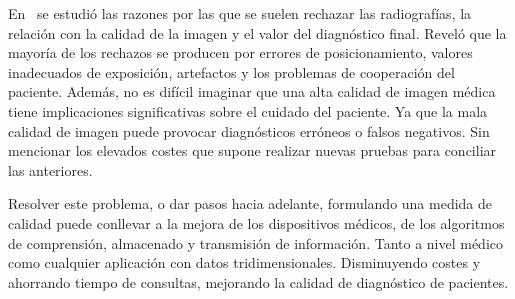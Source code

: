  
En~\cite{XrayRejectionFactor} se estudió las razones por las que se suelen 
rechazar las radiografías, la relación con la calidad de la imagen y el valor
del diagnóstico final. Reveló que la mayoría de los rechazos se producen por 
errores de posicionamiento, valores inadecuados de exposición, artefactos 
y los problemas de cooperación del paciente. 
Además, no es difícil imaginar que una alta 
calidad de imagen médica tiene implicaciones significativas sobre el cuidado
del paciente. Ya que la mala calidad de imagen puede provocar diagnósticos erróneos 
o falsos negativos. Sin mencionar los elevados costes que supone realizar 
nuevas pruebas para conciliar las anteriores.
 
Resolver este problema, o dar pasos hacia adelante, formulando una medida de calidad
puede conllevar a la mejora de los dispositivos médicos, de los algoritmos de comprensión, almacenado 
y transmisión de información. Tanto a nivel médico como cualquier 
aplicación con datos tridimensionales. Disminuyendo costes y ahorrando tiempo 
de consultas, mejorando la calidad de diagnóstico de pacientes. 

